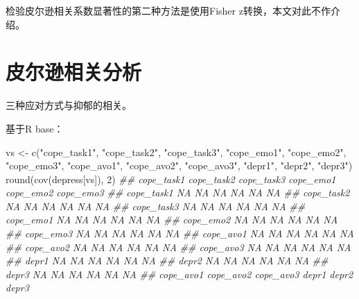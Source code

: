 \documentclass[
  chinese-hans,
  letterpaper,
  DIV=11,
  numbers=noendperiod]{scrartcl}
\newenvironment{Shaded}{\begin{snugshade}}{\end{snugshade}}
\newcommand{\DecValTok}[1]{\textcolor[rgb]{0.68,0.00,0.00}{#1}}
\newcommand{\DocumentationTok}[1]{\textcolor[rgb]{0.37,0.37,0.37}{\textit{#1}}}
\newcommand{\FunctionTok}[1]{\textcolor[rgb]{0.28,0.35,0.67}{#1}}
\newcommand{\NormalTok}[1]{\textcolor[rgb]{0.00,0.23,0.31}{#1}}
\newcommand{\OtherTok}[1]{\textcolor[rgb]{0.00,0.23,0.31}{#1}}
\newcommand{\StringTok}[1]{\textcolor[rgb]{0.13,0.47,0.30}{#1}}
\begin{document}
检验皮尔逊相关系数显著性的第二种方法是使用Fisher
z转换，本文对此不作介绍。

\section{皮尔逊相关分析}\label{ux76aeux5c14ux900aux76f8ux5173ux5206ux6790}

三种应对方式与抑郁的相关。

基于R base：

\begin{Shaded}
\begin{Highlighting}[numbers=left,,]
\NormalTok{vs }\OtherTok{\textless{}{-}} \FunctionTok{c}\NormalTok{(}\StringTok{"cope\_task1"}\NormalTok{, }\StringTok{"cope\_task2"}\NormalTok{, }\StringTok{"cope\_task3"}\NormalTok{, }
        \StringTok{"cope\_emo1"}\NormalTok{, }\StringTok{"cope\_emo2"}\NormalTok{, }\StringTok{"cope\_emo3"}\NormalTok{, }
        \StringTok{"cope\_avo1"}\NormalTok{, }\StringTok{"cope\_avo2"}\NormalTok{, }\StringTok{"cope\_avo3"}\NormalTok{, }
        \StringTok{"depr1"}\NormalTok{, }\StringTok{"depr2"}\NormalTok{, }\StringTok{"depr3"}\NormalTok{)}
\FunctionTok{round}\NormalTok{(}\FunctionTok{cov}\NormalTok{(depress[vs]), }\DecValTok{2}\NormalTok{)}
\DocumentationTok{\#\#            cope\_task1 cope\_task2 cope\_task3 cope\_emo1 cope\_emo2 cope\_emo3}
\DocumentationTok{\#\# cope\_task1         NA         NA         NA        NA        NA        NA}
\DocumentationTok{\#\# cope\_task2         NA         NA         NA        NA        NA        NA}
\DocumentationTok{\#\# cope\_task3         NA         NA         NA        NA        NA        NA}
\DocumentationTok{\#\# cope\_emo1          NA         NA         NA        NA        NA        NA}
\DocumentationTok{\#\# cope\_emo2          NA         NA         NA        NA        NA        NA}
\DocumentationTok{\#\# cope\_emo3          NA         NA         NA        NA        NA        NA}
\DocumentationTok{\#\# cope\_avo1          NA         NA         NA        NA        NA        NA}
\DocumentationTok{\#\# cope\_avo2          NA         NA         NA        NA        NA        NA}
\DocumentationTok{\#\# cope\_avo3          NA         NA         NA        NA        NA        NA}
\DocumentationTok{\#\# depr1              NA         NA         NA        NA        NA        NA}
\DocumentationTok{\#\# depr2              NA         NA         NA        NA        NA        NA}
\DocumentationTok{\#\# depr3              NA         NA         NA        NA        NA        NA}
\DocumentationTok{\#\#            cope\_avo1 cope\_avo2 cope\_avo3 depr1 depr2 depr3}

\end{Highlighting}
\end{Shaded}
\end{document}
